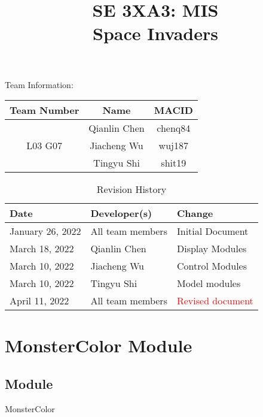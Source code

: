 \documentclass[12pt]{article}
\title{SE 3XA3: MIS\\Space Invaders}
\begin{document}
\maketitle

{\Large Team Information:}
\begin{table}[htp]
\centering
{\Large
\begin{tabular}{|c|c|c|}
\hline
\multicolumn{1}{|l|}{Team Number} & Name         & MACID   \\ \hline
\multirow{3}{*}{L03 G07}          & Qianlin Chen & chenq84 \\ \cline{2-3} 
                                  & Jiacheng Wu  & wuj187  \\ \cline{2-3} 
                                  & Tingyu Shi   & shit19  \\ \hline
\end{tabular}
}
\end{table}

\newpage
\begin{table}[htp]
\caption{Revision History} 
\begin{tabularx}{\textwidth}{llX}
\toprule
\textbf{Date} & \textbf{Developer(s)} & \textbf{Change}\\
\midrule
January 26, 2022 & All team members & Initial Document\\
March 18, 2022 & Qianlin Chen & Display Modules\\
March 10, 2022 & Jiacheng Wu & Control Modules\\
March 10, 2022 & Tingyu Shi & Model modules\\
April 11, 2022 & All team members & \textcolor{red}{Revised document}\\
\bottomrule
\end{tabularx}
\end{table}
\newpage
\tableofcontents
\listoftables
\listoffigures
\cleardoublepage

\section{MonsterColor Module}

\subsection*{Module}
MonsterColor
\end{document}
